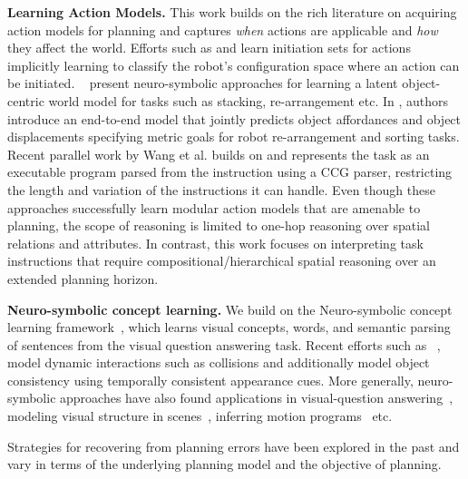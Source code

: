 \textbf{Learning Action Models.} This work builds on the rich literature on acquiring action models for planning and captures \emph{when} actions are applicable and 
\emph{how} they affect the world. 
%
Efforts such as \cite{konidaris2018skills} and \cite{wang2021learning} 
learn initiation sets for actions implicitly learning to classify
the robot's configuration space where an action can be initiated. 
%
~\cite{xia2018learning,silver2020few,zhu2021hierarchical} present neuro-symbolic approaches for learning a latent object-centric world model for tasks such as stacking, re-arrangement etc.  
%
In \cite{shridhar2022cliport}, authors introduce an end-to-end model that jointly predicts object affordances  and object displacements specifying metric goals for robot re-arrangement and sorting tasks. 
%
Recent parallel work by Wang et al. \cite{wang2023programmatically} builds on \cite{shridhar2022cliport} and represents the task as an executable program parsed from the instruction using a CCG parser, restricting the length and variation of the instructions it can handle. 
% 
Even though these approaches successfully learn modular action models that are amenable to planning, the scope of reasoning is limited to one-hop reasoning over spatial relations and attributes. In contrast, this work focuses on interpreting task instructions that require compositional/hierarchical spatial reasoning over an extended planning horizon. 


\textbf{Neuro-symbolic concept learning. } 
%
We build on the Neuro-symbolic concept learning framework~\cite{Mao2019NeuroSymbolic}, which learns visual concepts, words, and semantic parsing of sentences from the visual question answering task.
%
Recent efforts such as ~\cite{yi2019clevrer}, model dynamic interactions such as collisions and additionally model object consistency using temporally consistent appearance cues. 
%
More generally, neuro-symbolic approaches have also found applications in visual-question answering~\cite{yi2018neural}, 
modeling visual structure in scenes~\cite{li2020multi}, inferring motion programs~\cite{kulal2021hierarchical} etc.  



Strategies for recovering from planning errors have been explored in the past and vary in terms of the underlying planning model and the objective of planning. 

